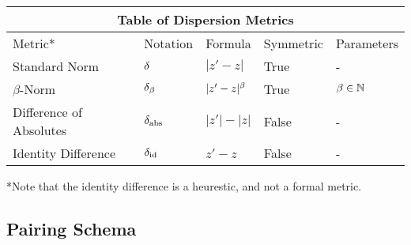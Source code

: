 \begin{tabular}{ |p{4.5cm}||p{2cm}|p{2cm}|p{2cm}|p{2cm}|  }
 \hline
 \multicolumn{5}{|c|}{Table of Dispersion Metrics} \\
 \hline
 Metric* & Notation & Formula & Symmetric & Parameters\\
 \hline
 Standard Norm & $\delta$ & $|z' - z|$ &  True & - \\
 $\beta$-Norm & $\delta_\beta$ & $|z' - z|^\beta$ & True & $\beta \in \mathbb{N}$ \\
 Difference of Absolutes & $\delta_{\text{abs}}$ & $|z'| - |z|$ &  False  &  - \\
 Identity Difference &  $\delta_{\text{id}}$ & $z' - z$ & False &  - \\
 \hline
\end{tabular}

\vspace{1em}

*Note that the identity difference is a heurestic, and not a formal metric.

\newpage


\subsection{Pairing Schema}



% 
% 
% 
% 

